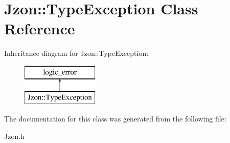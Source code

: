 \hypertarget{class_jzon_1_1_type_exception}{\section{Jzon\-:\-:Type\-Exception Class Reference}
\label{class_jzon_1_1_type_exception}
}
Inheritance diagram for Jzon\-:\-:Type\-Exception\-:\begin{figure}[H]
\begin{center}
\leavevmode
\includegraphics[height=2.000000cm]{class_jzon_1_1_type_exception}
\end{center}
\end{figure}


The documentation for this class was generated from the following file\-:\begin{DoxyCompactItemize}
\item 
Jzon.\-h\end{DoxyCompactItemize}
